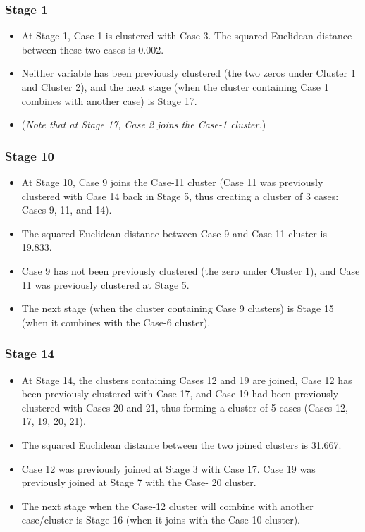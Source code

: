 \documentclass[a4paper,12pt]{article}
\begin{document}
\subsubsection*{Stage 1}
\begin{itemize}
	\item At Stage 1, Case 1 is clustered with Case 3. The squared Euclidean distance between these two cases is
	0.002. 
	\item Neither variable has been previously clustered (the two zeros under Cluster 1 and Cluster 2), and the
	next stage (when the cluster containing Case 1 combines with another case) is Stage 17. 
	\item (\textit{Note that at Stage
	17, Case 2 joins the Case-1 cluster.})
\end{itemize}


\subsubsection*{Stage 10}
\begin{itemize}
	\item At Stage 10, Case 9 joins the Case-11 cluster (Case 11 was previously clustered with Case 14 back in Stage
	5, thus creating a cluster of 3 cases: Cases 9, 11, and 14). 
	\item The squared Euclidean distance between Case 9
	and Case-11 cluster is 19.833. 
	\item Case 9 has not been previously clustered (the zero under Cluster 1), and
	Case 11 was previously clustered at Stage 5. 
	\item The next stage (when the cluster containing Case 9 clusters) is
	Stage 15 (when it combines with the Case-6 cluster).
\end{itemize}


\subsubsection*{Stage 14}
\begin{itemize}
	\item At Stage 14, the clusters containing Cases 12 and 19 are joined, Case 12 has been previously clustered with
	Case 17, and Case 19 had been previously clustered with Cases 20 and 21, thus forming a cluster of 5 cases
	(Cases 12, 17, 19, 20, 21). 
	\item The squared Euclidean distance between the two joined clusters is 31.667. 
	\item Case
	12 was previously joined at Stage 3 with Case 17. Case 19 was previously joined at Stage 7 with the Case-
	20 cluster. 
	\item The next stage when the Case-12 cluster will combine with another case/cluster is Stage 16
	(when it joins with the Case-10 cluster).
\end{itemize}
\end{document}
